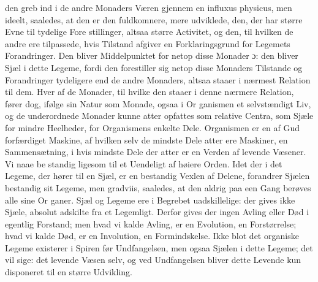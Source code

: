 \documentclass[12pt,a4paper]{book}
\begin{document}
den greb ind i de andre Monaders Væren gjennem en influxus
physicus, men ideelt, saaledes, at den er den fuldkomnere,
mere udviklede, den, der har større Evne til tydelige Fore\-%
stillinger, altsaa større Activitet, og den, til hvilken de andre
ere tilpassede, hvis Tilstand afgiver en Forklaringsgrund for
Legemets Forandringer. Den bliver Middelpunktet for netop disse
Monader ɔ: den bliver Sjæl i dette Legeme, fordi den forestiller
sig netop disse Monaders Tilstande og Forandringer tydeligere end
de andre Monaders, altsaa staaer i nærmest Relation til dem.
Hver af de Monader, til hvilke den staaer i denne nærmere
Relation, fører dog, ifølge sin Natur som Monade, ogsaa i Or\-%
ganismen et selvstændigt Liv, og de underordnede Monader
kunne atter opfattes som relative Centra, som Sjæle for mindre
Heelheder, for Organismens enkelte Dele. Organismen er en
af Gud forfærdiget Maskine, af hvilken selv de mindste Dele
atter ere Maskiner, en Sammensætning, i hvis mindste Dele
der atter er en Verden af levende Væsener. Vi naae be\-%
standig ligesom til et Uendeligt af høiere Orden. Idet der i
det Legeme, der hører til en Sjæl, er en bestandig Vexlen af
Delene, forandrer Sjælen bestandig sit Legeme, men gradviis,
saaledes, at den aldrig paa een Gang berøves alle sine Or\-%
ganer. Sjæl og Legeme ere i Begrebet uadskillelige: der
gives ikke Sjæle, absolut adskilte fra et Legemligt. Derfor
gives der ingen Avling eller Død i egentlig Forstand; men
hvad vi kalde Avling, er en Evolution, en Forstørrelse; hvad
vi kalde Død, er en Involution, en Formindskelse. Ikke blot
det organiske Legeme existerer i Spiren før Undfangelsen, men
ogsaa Sjælen i dette Legeme; det vil sige: det levende Væsen
selv, og ved Undfangelsen bliver dette Levende kun disponeret
til en større Udvikling.
\end{document}
